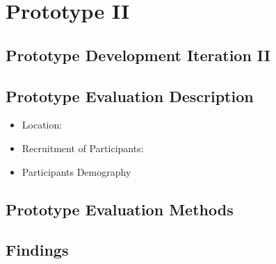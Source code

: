 
\chapter{Prototype II} %

\label{prototytpe2chapter} %


\section{Prototype Development Iteration II}
\section{Prototype Evaluation Description}
\begin{itemize}
\item{Location}:
\item{Recruitment of Participants}:
\item{Participants Demography}
\end{itemize}
\section{Prototype Evaluation Methods}
\section{Findings}
\begin{flushright}
\end{flushright}
